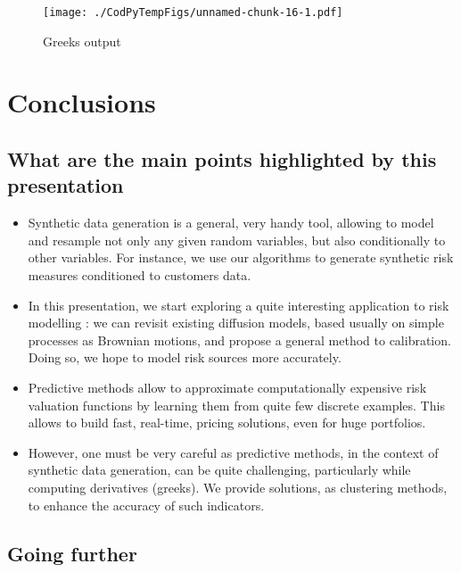 \documentclass[]{article}
\numberwithin{equation}{section}
\begin{document}
\begin{figure}
\centering
\texttt{[image: ./CodPyTempFigs/unnamed-chunk-16-1.pdf]}
\caption{\label{plot12} Greeks output}
\end{figure}

\newpage

\section{Conclusions}\label{conclusions}

\subsection{What are the main points highlighted by this
presentation}\label{what-are-the-main-points-highlighted-by-this-presentation}

\begin{itemize}
\item Synthetic data generation is a general, very handy tool, allowing to model and resample not only any given random variables, but also conditionally to other variables. For instance, we use our algorithms to generate synthetic risk measures conditioned to customers data.

\item In this presentation, we start exploring a quite interesting application to risk modelling : we can revisit existing diffusion models, based usually on simple processes as Brownian motions, and propose a general method to calibration. Doing so, we hope to model risk sources more accurately.

\item Predictive methods allow to approximate computationally expensive risk valuation functions by learning them from quite few discrete examples. This allows to build fast, real-time, pricing solutions, even for huge portfolios.

\item However, one must be very careful as predictive methods, in the context of synthetic data generation, can be quite challenging, particularly while computing derivatives (greeks). We provide solutions, as clustering methods, to enhance the accuracy of such indicators.


\end{itemize}

\subsection{Going further}\label{going-further}
\end{document}
